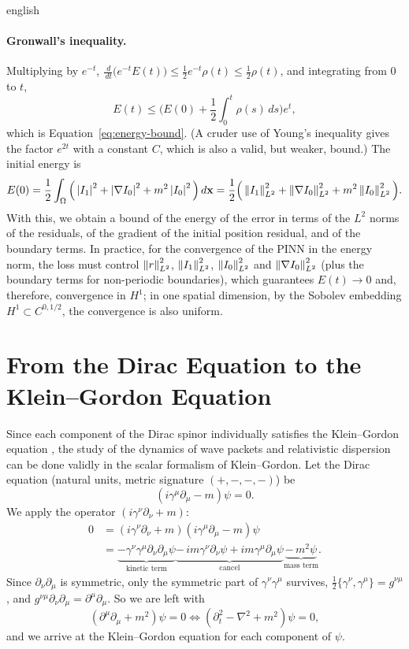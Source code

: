 \begin{hyphenrules}{english}
\paragraph{Gronwall's inequality.}
Multiplying by $e^{-t}$, $\frac{\,d}{\,d t}\big(e^{-t}E(t)\big)\le\frac12e^{-t}\rho(t)\le\frac12\rho(t)$, and
integrating from $0$ to $t$,
\[
  E(t)\le\Big(E(0)+\frac12\int_0^t\rho(s)\,d s\Big)e^{t},
\]
which is Equation~\eqref{eq:energy-bound}. (A cruder use of Young's inequality gives the factor $e^{2t}$ with a constant $C$, which is also
a valid, but weaker, bound.) The initial energy is
\[
  E(0)=\frac12\int_\Omega\Big(\left\lvert I_1 \right\rvert^2+\left\lvert \nabla I_0 \right\rvert^2+m^2\left\lvert I_0 \right\rvert^2\Big)\,d\mathbf{x}
  =\frac12\Big(\left\lVert I_1 \right\rVert^2_{L^2}+\left\lVert \nabla I_0 \right\rVert^2_{L^2}+m^2\left\lVert I_0 \right\rVert^2_{L^2}\Big).
\]
With this, we obtain a bound of the energy of the error in terms of the $L^2$ norms of the residuals, of the
gradient of the initial position residual, and of the boundary terms. In practice, for the convergence of
the PINN in the energy norm, the loss must control $\left\lVert r \right\rVert^2_{L^2}$, $\left\lVert I_1 \right\rVert^2_{L^2}$,
$\left\lVert I_0 \right\rVert^2_{L^2}$ and $\left\lVert \nabla I_0 \right\rVert^2_{L^2}$ (plus the boundary terms for non-periodic boundaries),
which guarantees $E(t)\to0$ and, therefore, convergence in $H^1$; in one spatial dimension, by the Sobolev
embedding $H^1\subset C^{0,1/2}$, the convergence is also uniform.

\section{From the Dirac Equation to the Klein--Gordon Equation}\label{app:dirac}

Since each component of the Dirac spinor individually satisfies the Klein--Gordon equation
\cite{bjorken1964}, the study of the dynamics of wave packets and relativistic dispersion can be done
validly in the scalar formalism of Klein--Gordon. Let the Dirac equation (natural units, metric signature
$(+,-,-,-)$) be
\begin{equation}
  (i\gamma^{\mu}\partial_\mu-m)\psi=0.
  \label{eq:dirac}
\end{equation}
We apply the operator $(i\gamma^{\nu}\partial_\nu+m)$:
\begin{align*}
  0&=(i\gamma^{\nu}\partial_\nu+m)(i\gamma^{\mu}\partial_\mu-m)\psi\\
   &=\underbrace{-\gamma^{\nu}\gamma^{\mu}\partial_\nu\partial_\mu\psi}_{\text{kinetic term}}
     \underbrace{-\,i m\gamma^{\nu}\partial_\nu\psi+i m\gamma^{\mu}\partial_\mu\psi}_{\text{cancel}}
     \underbrace{-\,m^2\psi}_{\text{mass term}}.
\end{align*}
Since $\partial_\nu\partial_\mu$ is symmetric, only the symmetric part of $\gamma^{\nu}\gamma^{\mu}$ survives,
$\frac12\{\gamma^{\nu},\gamma^{\mu}\}=g^{\nu\mu}$, and $g^{\nu\mu}\partial_\nu\partial_\mu=\partial^{\mu}\partial_\mu$.
So we are left with
\[
  (\partial^{\mu}\partial_\mu+m^2)\psi=0\iff(\partial_t^2-\nabla^2+m^2)\psi=0,
\]
and we arrive at the Klein--Gordon equation for each component of $\psi$.

\end{hyphenrules}
